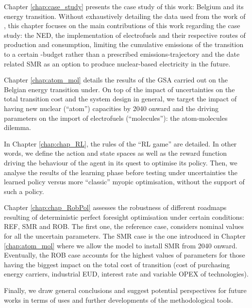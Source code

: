 Chapter \ref{chap:case_study} presents the case study of this work: Belgium and its energy transition. Without exhaustively detailing the data used from the work of \citet{limpens2021generating}, this chapter focuses on the main contributions of this work regarding the case study: the \gls{NED}, the implementation of electrofuels and their respective routes of production and consumption, limiting  the cumulative emissions of the transition to a certain -budget rather than a prescribed emissions-trajectory and the date related \gls{SMR} as an option to produce nuclear-based electricity in the future.

Chapter \ref{chap:atom_mol} details the results of the \gls{GSA} carried out on the Belgian energy transition under. On top of the impact of uncertainties on the total transition cost and the system design in general, we target the impact of having new nuclear (``atom'') capacities by 2040 onward and the driving parameters on the import of electrofuels (``molecules''): the atom-molecules dilemma.

In Chapter \ref{chap:chap_RL}, the rules of the ``\gls{RL} game'' are detailed. In other words, we define the action and state spaces as well as the reward function driving the behaviour of the agent in its quest to optimise its policy. Then, we analyse the results of the learning phase before testing under uncertainties the learned policy versus more ``classic'' myopic optimisation, \ie without the support of such a policy.

Chapter \ref{chap:chap_RobPol} assesses the robustness of different roadmaps resulting of deterministic perfect foresight optimisation under certain conditions: REF, SMR and ROB. The first one, the reference case, considers nominal values for all the uncertain parameters. The SMR case is the one introduced in Chapter \ref{chap:atom_mol} where we allow the model to install \gls{SMR} from 2040 onward. Eventually, the ROB case accounts for the highest values of parameters for those having the biggest impact on the total cost of transition (\ie cost of purchasing energy carriers, industrial \gls{EUD}, interest rate and variable \gls{OPEX} of technologies).

Finally, we draw general conclusions and suggest potential perspectives for future works in terms of uses and further developments of the methodological tools.